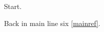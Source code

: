 \documentclass{article}
\begin{document}
Start.

Back in main line six \ref{mainref}.
\end{document}
